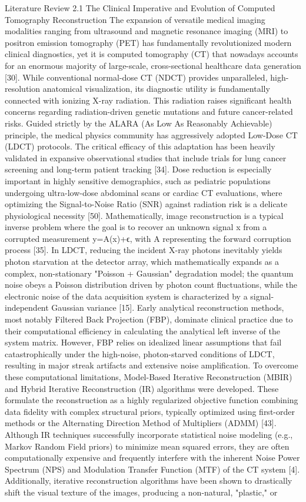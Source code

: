 Literature Review
2.1 The Clinical Imperative and Evolution of Computed Tomography Reconstruction The expansion of versatile medical imaging modalities ranging from ultrasound and magnetic resonance imaging (MRI) to positron emission tomography (PET) has fundamentally revolutionized modern clinical diagnostics, yet it is computed tomography (CT) that nowadays accounts for an enormous majority of large-scale, cross-sectional healthcare data generation [30]. While conventional normal-dose CT (NDCT) provides unparalleled, high-resolution anatomical visualization, its diagnostic utility is fundamentally connected with ionizing X-ray radiation. This radiation raises significant health concerns regarding radiation-driven genetic mutations and future cancer-related risks. Guided strictly by the ALARA (As Low As Reasonably Achievable) principle, the medical physics community has aggressively adopted Low-Dose CT (LDCT) protocols. The critical efficacy of this adaptation has been heavily validated in expansive observational studies that include trials for lung cancer screening and long-term patient tracking [34]. Dose reduction is especially important in highly sensitive demographics, such as pediatric populations undergoing ultra-low-dose abdominal scans or cardiac CT evaluations, where optimizing the Signal-to-Noise Ratio (SNR) against radiation risk is a delicate physiological necessity [50]. Mathematically, image reconstruction is a typical inverse problem where the goal is to recover an unknown signal x from a corrupted measurement y=A(x)+ϵ, with A representing the forward corruption process [35]. In LDCT, reducing the incident X-ray photons inevitably yields photon starvation at the detector array, which mathematically expands as a complex, non-stationary "Poisson + Gaussian" degradation model; the quantum noise obeys a Poisson distribution driven by photon count fluctuations, while the electronic noise of the data acquisition system is characterized by a signal-independent Gaussian variance [15]. Early analytical reconstruction methods, most notably Filtered Back Projection (FBP), dominate clinical practice due to their computational efficiency in calculating the analytical left inverse of the system matrix. However, FBP relies on idealized linear assumptions that fail catastrophically under the high-noise, photon-starved conditions of LDCT, resulting in major streak artifacts and extensive noise amplification. To overcome these computational limitations, Model-Based Iterative Reconstruction (MBIR) and Hybrid Iterative Reconstruction (IR) algorithms were developed. These formulate the reconstruction as a highly regularized objective function combining data fidelity with complex structural priors, typically optimized using first-order methods or the Alternating Direction Method of Multipliers (ADMM) [43]. Although IR techniques successfully incorporate statistical noise modeling (e.g., Markov Random Field priors) to minimize mean squared errors, they are often computationally expensive and frequently interfere with the inherent Noise Power Spectrum (NPS) and Modulation Transfer Function (MTF) of the CT system [4]. Additionally, iterative reconstruction algorithms have been shown to drastically shift the visual texture of the images, producing a non-natural, "plastic," or 